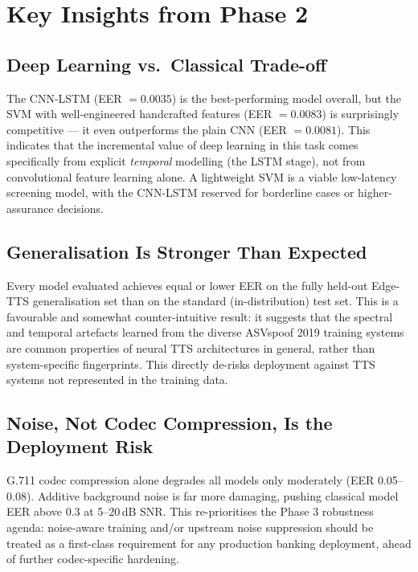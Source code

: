 \documentclass[12pt,a4paper]{report}
\begin{document}
\chapter{Key Insights from Phase 2}

\section{Deep Learning vs.\ Classical Trade-off}

The CNN-LSTM (EER $=0.0035$) is the best-performing model overall, but the SVM with
well-engineered handcrafted features (EER $=0.0083$) is surprisingly competitive ---
it even outperforms the plain CNN (EER $=0.0081$). This indicates that the incremental
value of deep learning in this task comes specifically from explicit \emph{temporal}
modelling (the LSTM stage), not from convolutional feature learning alone. A lightweight
SVM is a viable low-latency screening model, with the CNN-LSTM reserved for borderline
cases or higher-assurance decisions.

\section{Generalisation Is Stronger Than Expected}

Every model evaluated achieves equal or lower EER on the fully held-out Edge-TTS
generalisation set than on the standard (in-distribution) test set. This is a favourable
and somewhat counter-intuitive result: it suggests that the spectral and temporal artefacts
learned from the diverse ASVspoof 2019 training systems are common properties of neural
TTS architectures in general, rather than system-specific fingerprints. This directly
de-risks deployment against TTS systems not represented in the training data.

\section{Noise, Not Codec Compression, Is the Deployment Risk}

G.711 codec compression alone degrades all models only moderately (EER 0.05--0.08).
Additive background noise is far more damaging, pushing classical model EER above 0.3 at
5--20\,dB SNR. This re-prioritises the Phase 3 robustness agenda: noise-aware training
and/or upstream noise suppression should be treated as a first-class requirement for any
production banking deployment, ahead of further codec-specific hardening.
\end{document}
